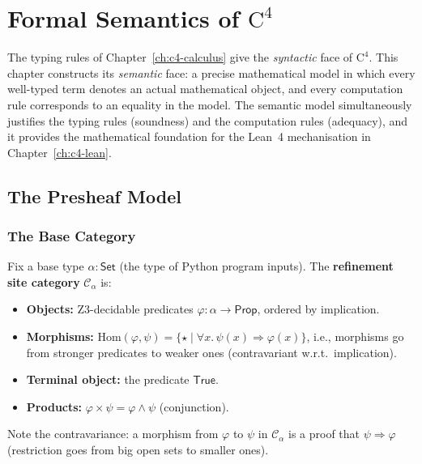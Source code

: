 
\chapter{Formal Semantics of \(\mathrm{C}^4\)}
\label{ch:c4-formal-semantics}

The typing rules of Chapter~\ref{ch:c4-calculus} give the
\emph{syntactic} face of $\mathrm{C}^4$.  This chapter constructs its
\emph{semantic} face: a precise mathematical model in which every
well-typed term denotes an actual mathematical object, and every
computation rule corresponds to an equality in the model.  The
semantic model simultaneously justifies the typing rules (soundness)
and the computation rules (adequacy), and it provides the mathematical
foundation for the Lean~4 mechanisation in Chapter~\ref{ch:c4-lean}.


\section{The Presheaf Model}
\label{sec:presheaf-model}

\subsection{The Base Category}

Fix a base type \(\alpha : \mathsf{Set}\) (the type of Python program inputs).
The \textbf{refinement site category} \(\mathcal{C}_\alpha\) is:
\begin{itemize}
\item \textbf{Objects:} Z3-decidable predicates
  \(\varphi : \alpha \to \mathsf{Prop}\), ordered by implication.
\item \textbf{Morphisms:}
  \(\mathrm{Hom}(\varphi, \psi) = \{\star \mid \forall x.\, \psi(x) \Rightarrow \varphi(x)\}\),
  i.e., morphisms go from stronger predicates to weaker ones
  (contravariant w.r.t.\ implication).
\item \textbf{Terminal object:} the predicate \(\mathsf{True}\).
\item \textbf{Products:}
  \(\varphi \times \psi = \varphi \wedge \psi\) (conjunction).
\end{itemize}

Note the contravariance: a morphism from \(\varphi\) to \(\psi\) in
\(\mathcal{C}_\alpha\) is a proof that \(\psi \Rightarrow \varphi\)
(restriction goes from big open sets to smaller ones).

